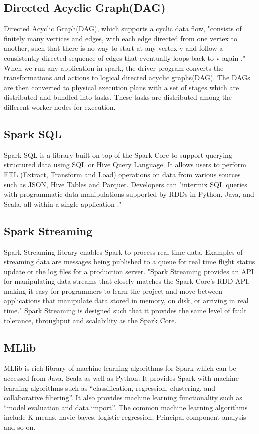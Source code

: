 \documentclass[9pt,twocolumn,twoside]{../../styles/osajnl}
\begin{document}
\subsection{Directed Acyclic Graph(DAG)}
Directed Acyclic Graph(DAG), which supports a cyclic data flow, "consists of finitely many vertices and edges, with each edge directed from one vertex to another, such that there is no way to start at any vertex v and follow a consistently-directed sequence of edges that eventually loops back to v again \cite{wiki-DAG}." When we run any application in spark, the driver program converts the transformations and actions to logical directed acyclic graphs(DAG). The DAGs are then converted to physical execution plans with a set of stages which are distributed and bundled into tasks. These tasks are distributed among the different worker nodes for execution.

\subsection{Spark SQL}
Spark SQL\cite{book-spark} is a library built on top of the Spark Core to support
querying structured data using SQL or Hive Query Language. It allows
users to perform ETL (Extract, Transform and Load) operations on data
from various sources such as JSON, Hive Tables and Parquet. Developers
can "intermix SQL queries with programmatic data manipulations
supported by RDDs in Python, Java, and Scala, all within a single
application \cite{book-spark}."

\subsection{Spark Streaming}
Spark Streaming \cite{book-spark} library enables Spark to process real time
data. Examples of streaming data are messages being published to a
queue for real time flight status update or the log files for a
production server. "Spark Streaming provides an API for manipulating
data streams that closely matches the Spark Core’s RDD API, making it
easy for programmers to learn the project and move between
applications that manipulate data stored in memory, on disk, or
arriving in real time." Spark Streaming is designed such that it
provides the same level of fault tolerance, throughput and scalability
as the Spark Core.

\subsection{MLlib}
MLlib \cite{book-spark} is rich library of machine learning algorithms for Spark which
can be accessed from Java, Scala as well as Python. It provides Spark
with machine learning algorithms such as “classification, regression,
clustering, and collaborative filtering”. It also provides machine
learning functionality such as “model evaluation and data import”. The
common machine learning algorithms include K-means, navie bayes,
logistic regression, Principal component analysis and so on.
\end{document}
